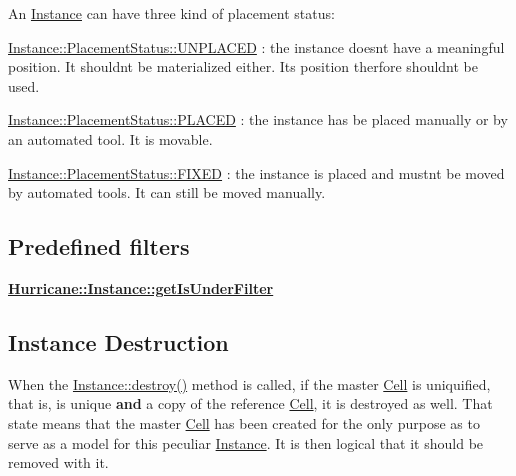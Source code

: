 An \mbox{\hyperlink{classHurricane_1_1Instance}{Instance}} can have three kind of placement status\+:
\begin{DoxyItemize}
\item \mbox{\hyperlink{classHurricane_1_1Instance_1_1PlacementStatus_af76cc0838783b3eb3a515eb3c3e0f7bfa3e19a0a1b3e8c8fd860164df7f935216}{Instance\+::\+Placement\+Status\+::\+U\+N\+P\+L\+A\+C\+ED}} \+: the instance doesn\textquotesingle{}t have a meaningful position. It shouldn\textquotesingle{}t be materialized either. It\textquotesingle{}s position therfore shouldn\textquotesingle{}t be used.
\item \mbox{\hyperlink{classHurricane_1_1Instance_1_1PlacementStatus_af76cc0838783b3eb3a515eb3c3e0f7bfaf3589c11ecd7d5de63db24826b74d457}{Instance\+::\+Placement\+Status\+::\+P\+L\+A\+C\+ED}} \+: the instance has be placed manually or by an automated tool. It is movable.
\item \mbox{\hyperlink{classHurricane_1_1Instance_1_1PlacementStatus_af76cc0838783b3eb3a515eb3c3e0f7bfa47be8a40f04081635fe24485ae7c6bd7}{Instance\+::\+Placement\+Status\+::\+F\+I\+X\+ED}} \+: the instance is placed and mustn\textquotesingle{}t be moved by automated tools. It can still be moved manually.
\end{DoxyItemize}\hypertarget{classHurricane_1_1Instance_secInstancePredefinedFilters}{}\subsection{Predefined filters}\label{classHurricane_1_1Instance_secInstancePredefinedFilters}
{\bfseries \mbox{\hyperlink{classHurricane_1_1Instance_ae2bc936dfecfaf70a0052959b4b2861e}{Hurricane\+::\+Instance\+::get\+Is\+Under\+Filter}}}\hypertarget{classHurricane_1_1Instance_secInstanceDestroy}{}\subsection{Instance Destruction}\label{classHurricane_1_1Instance_secInstanceDestroy}
When the \mbox{\hyperlink{classHurricane_1_1DBo_a67febf5bf9c8b322674648688639728b}{Instance\+::destroy()}} method is called, if the master \mbox{\hyperlink{classHurricane_1_1Cell}{Cell}} is uniquified, that is, is unique {\bfseries and} a copy of the reference \mbox{\hyperlink{classHurricane_1_1Cell}{Cell}}, it is destroyed as well. That state means that the master \mbox{\hyperlink{classHurricane_1_1Cell}{Cell}} has been created for the only purpose as to serve as a model for this peculiar \mbox{\hyperlink{classHurricane_1_1Instance}{Instance}}. It is then logical that it should be removed with it. 

